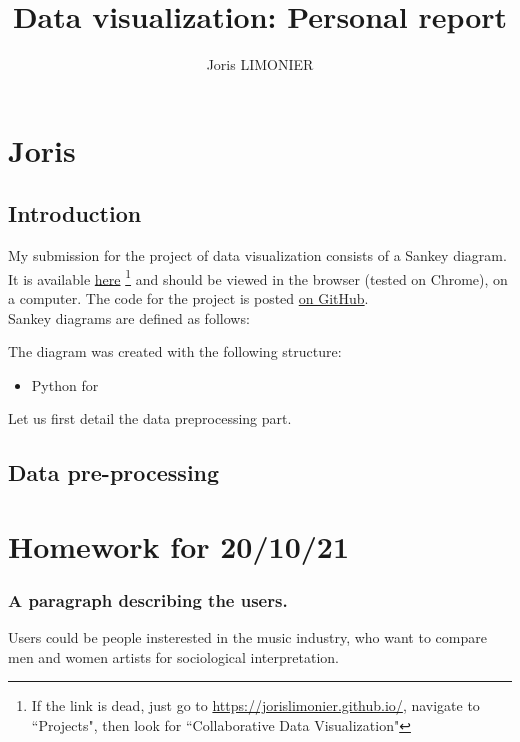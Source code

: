 \documentclass{article}
\title{Data visualization: Personal report}
\author{Joris LIMONIER}
\begin{document}
\maketitle

\tableofcontents
\newpage
\section{Joris}
\subsection{Introduction}

My submission for the project of data visualization consists of a Sankey diagram. It is available \href{https://jorislimonier.github.io/projects/collab-data-vis/index.html}{here} \footnote{If the link is dead, just go to \href{https://jorislimonier.github.io/}{https://jorislimonier.github.io/}, navigate to ``Projects", then look for ``Collaborative Data Visualization"} and should be viewed in the browser (tested on Chrome), on a computer. The code for the project is posted \href{https://github.com/jorislimonier/collab-viz/tree/main/joris}{on GitHub}. \\
Sankey diagrams are defined as follows:%

The diagram was created with the following structure:

\begin{itemize}
    \item Python for 
\end{itemize}


Let us first detail the data preprocessing part.

\subsection{Data pre-processing}

\newpage


\section{Homework for 20/10/21}

\subsubsection*{A paragraph describing the users.}
Users could be people insterested in the music industry, who want to compare men and women artists for sociological interpretation.
\end{document}
